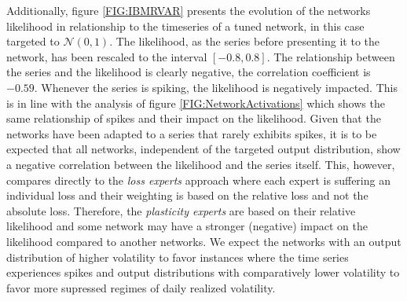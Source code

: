 Additionally, figure \ref{FIG:IBMRVAR} presents the evolution of the networks likelihood in relationship to the timeseries of a tuned network, in this case targeted to $\mathcal{N}(0,1)$. The likelihood, as the series before presenting it to the network, has been rescaled to the interval $[-0.8,0.8]$. The relationship between the series and the likelihood is clearly negative, the correlation coefficient is $-0.59$. Whenever the series is spiking, the likelihood is negatively impacted. This is in line with the analysis of figure \ref{FIG:NetworkActivations} which shows the same relationship of spikes and their impact on the likelihood. Given that the networks have been adapted to a series that rarely exhibits spikes, it is to be expected that all networks, independent of the targeted output distribution, show a negative correlation between the likelihood and the series itself. 
This, however, compares directly to the \textit{loss experts} approach where each expert is suffering an individual loss and their weighting is based on the relative loss and not the absolute loss. Therefore, the \textit{plasticity experts} are based on their relative likelihood and some network may have a stronger (negative) impact on the likelihood compared to another networks.
We expect the networks with an output distribution of higher volatility to favor instances where the time series experiences spikes and output distributions with comparatively lower volatility to favor more supressed regimes of daily realized volatility.


